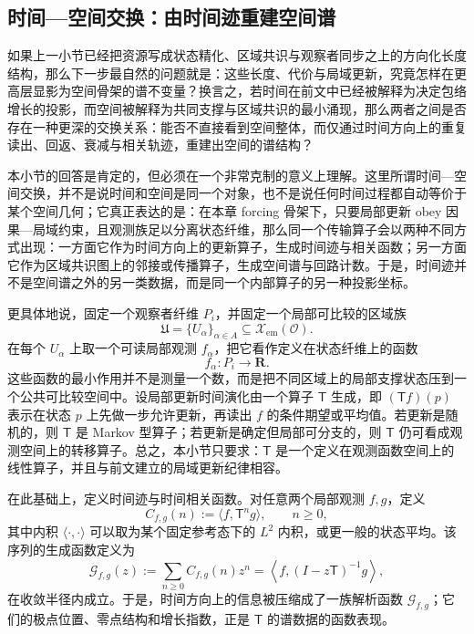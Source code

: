 \subsection{时间—空间交换：由时间迹重建空间谱}\label{subsec:physical-spacetime-skeleton-time-space-exchange}

如果上一小节已经把资源写成状态精化、区域共识与观察者同步之上的方向化长度结构，那么下一步最自然的问题就是：这些长度、代价与局域更新，究竟怎样在更高层显影为空间骨架的谱不变量？换言之，若时间在前文中已经被解释为决定包络增长的投影，而空间被解释为共同支撑与区域共识的最小涌现，那么两者之间是否存在一种更深的交换关系：能否不直接看到空间整体，而仅通过时间方向上的重复读出、回返、衰减与相关轨迹，重建出空间的谱结构？

本小节的回答是肯定的，但必须在一个非常克制的意义上理解。这里所谓时间—空间交换，并不是说时间和空间是同一个对象，也不是说任何时间过程都自动等价于某个空间几何；它真正表达的是：在本章 forcing 骨架下，只要局部更新 obey 因果—局域约束，且观测族足以分离状态纤维，那么同一个传输算子会以两种不同方式出现：一方面它作为时间方向上的更新算子，生成时间迹与相关函数；另一方面它作为区域共识图上的邻接或传播算子，生成空间谱与回路计数。于是，时间迹并不是空间谱之外的另一类数据，而是同一个内部算子的另一种投影坐标。

更具体地说，固定一个观察者纤维 \(P_i\)，并固定一个局部可比较的区域族
\[
\mathfrak U=\{U_\alpha\}_{\alpha\in A}\subseteq \mathcal X_{\mathrm{em}}(\mathcal O).
\]
在每个 \(U_\alpha\) 上取一个可读局部观测 \(f_\alpha\)，把它看作定义在状态纤维上的函数
\[
f_\alpha:P_i\to \mathbf R.
\]
这些函数的最小作用并不是测量一个数，而是把不同区域上的局部支撑状态压到一个公共可比较空间中。设局部更新时间演化由一个算子 \(\mathsf T\) 生成，即 \((\mathsf T f)(p)\) 表示在状态 \(p\) 上先做一步允许更新，再读出 \(f\) 的条件期望或平均值。若更新是随机的，则 \(\mathsf T\) 是 Markov 型算子；若更新是确定但局部可分支的，则 \(\mathsf T\) 仍可看成观测空间上的转移算子。总之，本小节只要求：\(\mathsf T\) 是一个定义在观测函数空间上的线性算子，并且与前文建立的局域更新纪律相容。

在此基础上，定义时间迹与时间相关函数。对任意两个局部观测 \(f,g\)，定义
\[
C_{f,g}(n):=\langle f,\mathsf T^n g\rangle,\qquad n\ge 0,
\]
其中内积 \(\langle\cdot,\cdot\rangle\) 可以取为某个固定参考态下的 \(L^2\) 内积，或更一般的状态平均。该序列的生成函数定义为
\[
\mathcal G_{f,g}(z)
:=
\sum_{n\ge 0} C_{f,g}(n) z^n
=
\left\langle f,(I-z\mathsf T)^{-1}g\right\rangle,
\]
在收敛半径内成立。于是，时间方向上的信息被压缩成了一族解析函数 \(\mathcal G_{f,g}\)；它们的极点位置、零点结构和增长指数，正是 \(\mathsf T\) 的谱数据的函数表现。

